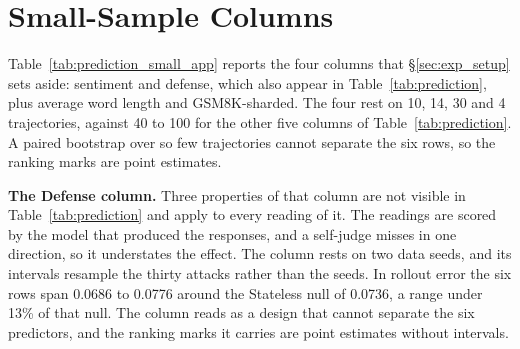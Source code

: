\section{Small-Sample Columns}
\label{app:A2_small_columns}



Table~\ref{tab:prediction_small_app} reports the four columns that \S\ref{sec:exp_setup} sets aside: sentiment and defense, which also appear in Table~\ref{tab:prediction}, plus average word length and GSM8K-sharded.  %
The four rest on 10, 14, 30 and 4 trajectories, against 40 to 100 for the other five columns of Table~\ref{tab:prediction}.
A paired bootstrap over so few trajectories cannot separate the six rows, so the ranking marks are point estimates.  %

\textbf{The Defense column.} Three properties of that column are not visible in Table~\ref{tab:prediction} and apply to every reading of it.  %
The readings are scored by the model that produced the responses, and a self-judge misses in one direction, so it understates the effect.  %
The column rests on two data seeds, and its intervals resample the thirty attacks rather than the seeds.  %
In rollout error the six rows span 0.0686 to 0.0776 around the Stateless null of 0.0736, a range under 13\% of that null.  %
The column reads as a design that cannot separate the six predictors, and the ranking marks it carries are point estimates without intervals.  %
